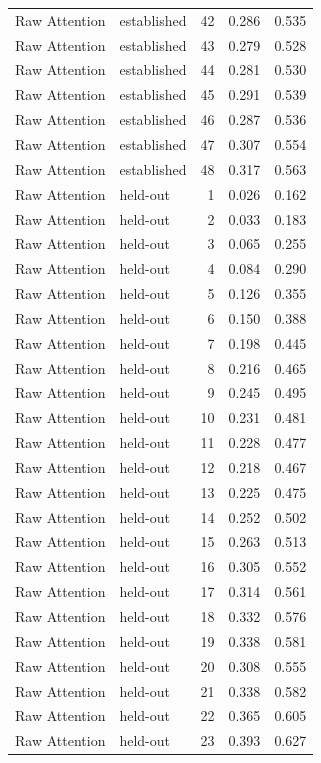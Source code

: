 \begin{tabular}{llrrr}
Raw Attention & established & 42 & 0.286 & 0.535 \\
Raw Attention & established & 43 & 0.279 & 0.528 \\
Raw Attention & established & 44 & 0.281 & 0.530 \\
Raw Attention & established & 45 & 0.291 & 0.539 \\
Raw Attention & established & 46 & 0.287 & 0.536 \\
Raw Attention & established & 47 & 0.307 & 0.554 \\
Raw Attention & established & 48 & 0.317 & 0.563 \\
Raw Attention & held-out & 1 & 0.026 & 0.162 \\
Raw Attention & held-out & 2 & 0.033 & 0.183 \\
Raw Attention & held-out & 3 & 0.065 & 0.255 \\
Raw Attention & held-out & 4 & 0.084 & 0.290 \\
Raw Attention & held-out & 5 & 0.126 & 0.355 \\
Raw Attention & held-out & 6 & 0.150 & 0.388 \\
Raw Attention & held-out & 7 & 0.198 & 0.445 \\
Raw Attention & held-out & 8 & 0.216 & 0.465 \\
Raw Attention & held-out & 9 & 0.245 & 0.495 \\
Raw Attention & held-out & 10 & 0.231 & 0.481 \\
Raw Attention & held-out & 11 & 0.228 & 0.477 \\
Raw Attention & held-out & 12 & 0.218 & 0.467 \\
Raw Attention & held-out & 13 & 0.225 & 0.475 \\
Raw Attention & held-out & 14 & 0.252 & 0.502 \\
Raw Attention & held-out & 15 & 0.263 & 0.513 \\
Raw Attention & held-out & 16 & 0.305 & 0.552 \\
Raw Attention & held-out & 17 & 0.314 & 0.561 \\
Raw Attention & held-out & 18 & 0.332 & 0.576 \\
Raw Attention & held-out & 19 & 0.338 & 0.581 \\
Raw Attention & held-out & 20 & 0.308 & 0.555 \\
Raw Attention & held-out & 21 & 0.338 & 0.582 \\
Raw Attention & held-out & 22 & 0.365 & 0.605 \\
Raw Attention & held-out & 23 & 0.393 & 0.627 \\

\end{tabular}
